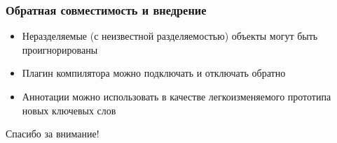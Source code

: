 \documentclass[14pt,xcolor={dvipsnames}]{beamer}
\begin{document}
\begin{frame}
\frametitle{Обратная совместимость и внедрение}
\begin{itemize}
  \item Неразделяемые (с неизвестной разделяемостью) объекты могут быть проигнорированы
  \item Плагин компилятора можно подключать и отключать обратно
  \item Аннотации можно использовать в качестве легкоизменяемого прототипа новых ключевых слов
\end{itemize}
\end{frame}

\begin{frame}
\begin{center}
Спасибо за внимание!
\end{center}
\end{frame}
\end{document}
